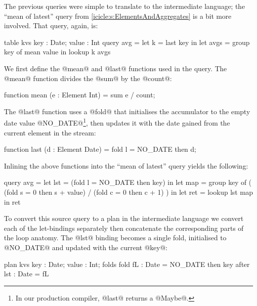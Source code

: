 The previous queries were simple to translate to the intermediate language; the ``mean of latest'' query from \cref{icicle:s:ElementsAndAggregates} is a bit more involved.
That query, again, is:

\begin{icicle}
  table kvs { key : Date; value : Int } 
  query avg = let k    = last  key in
              let avgs = group key of mean value
              in  lookup k avgs
\end{icicle}

We first define the @mean@ and @last@ functions used in the query.
The @mean@ function divides the @sum@ by the @count@:
\begin{icicle}
function mean (e : Element Int)
 = sum e / count;
\end{icicle}

The @last@ function uses a @fold@ that initialises the accumulator to the empty date value @NO_DATE@\footnote{In our production compiler, @last@ returns a @Maybe@.}, then updates it with the date gained from the current element in the stream:
\begin{icicle}
function last (d : Element Date)
 = fold l = NO_DATE then d;
\end{icicle}



Inlining the above functions into the ``mean of latest'' query yields the following:
\begin{icicle}
query avg
 =    let lst = (fold l = NO_DATE then key)
   in let map = group key of
                ( (fold s = 0 then s + value)
                / (fold c = 0 then c + 1) )
   in let ret = lookup lst map
   in     ret
\end{icicle}

To convert this source query to a plan in the intermediate language we convert each of the let-bindings separately then concatenate the corresponding parts of the loop anatomy.
The @lst@ binding becomes a single fold, initialised to @NO_DATE@ and updated with the current @key@:
\begin{icicle-core}
plan kvs {      key : Date; value : Int;       }
folds    { fold fL  : Date = NO_DATE then key  }
after    {      lst : Date = fL                }
\end{icicle-core}

